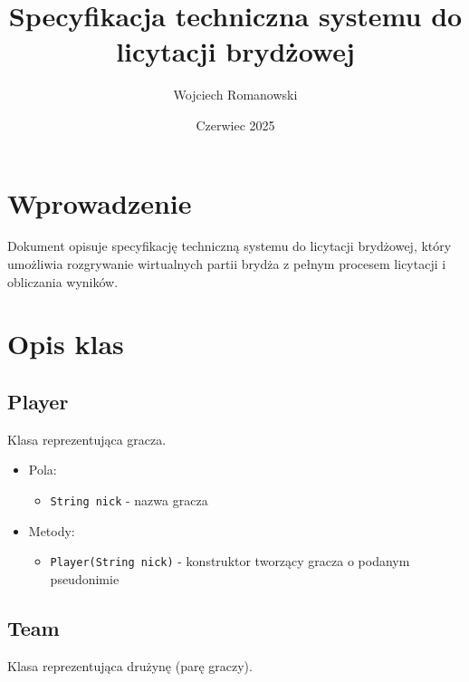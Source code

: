 \documentclass{article}
\title{Specyfikacja techniczna systemu do licytacji brydżowej}
\author{Wojciech Romanowski}
\date{Czerwiec 2025}
\begin{document}
\maketitle

\tableofcontents

\section{Wprowadzenie}
Dokument opisuje specyfikację techniczną systemu do licytacji brydżowej, który umożliwia rozgrywanie wirtualnych partii brydża z pełnym procesem licytacji i obliczania wyników.

\section{Opis klas}

\subsection{Player}
Klasa reprezentująca gracza.

\begin{itemize}
    \item Pola:
    \begin{itemize}
        \item \texttt{String nick} - nazwa gracza
    \end{itemize}
    
    \item Metody:
    \begin{itemize}
        \item \texttt{Player(String nick)} - konstruktor tworzący gracza o podanym pseudonimie
    \end{itemize}
\end{itemize}

\subsection{Team}
Klasa reprezentująca drużynę (parę graczy).
\end{document}
